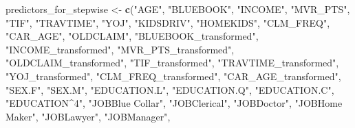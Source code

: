 \documentclass[
]{article}
\newenvironment{Shaded}{\begin{snugshade}}{\end{snugshade}}
\newcommand{\FunctionTok}[1]{\textcolor[rgb]{0.13,0.29,0.53}{\textbf{#1}}}
\newcommand{\NormalTok}[1]{#1}
\newcommand{\OtherTok}[1]{\textcolor[rgb]{0.56,0.35,0.01}{#1}}
\newcommand{\StringTok}[1]{\textcolor[rgb]{0.31,0.60,0.02}{#1}}
\begin{document}
\begin{Shaded}
\begin{Highlighting}[]
\NormalTok{  predictors\_for\_stepwise }\OtherTok{\textless{}{-}} \FunctionTok{c}\NormalTok{(}\StringTok{"\textasciigrave{}AGE\textasciigrave{}"}\NormalTok{, }\StringTok{"\textasciigrave{}BLUEBOOK\textasciigrave{}"}\NormalTok{, }\StringTok{"\textasciigrave{}INCOME\textasciigrave{}"}\NormalTok{, }
                  \StringTok{"\textasciigrave{}MVR\_PTS\textasciigrave{}"}\NormalTok{, }\StringTok{"\textasciigrave{}TIF\textasciigrave{}"}\NormalTok{, }\StringTok{"\textasciigrave{}TRAVTIME\textasciigrave{}"}\NormalTok{, }
                  \StringTok{"\textasciigrave{}YOJ\textasciigrave{}"}\NormalTok{, }\StringTok{"\textasciigrave{}KIDSDRIV\textasciigrave{}"}\NormalTok{, }\StringTok{"\textasciigrave{}HOMEKIDS\textasciigrave{}"}\NormalTok{, }
                  \StringTok{"\textasciigrave{}CLM\_FREQ\textasciigrave{}"}\NormalTok{, }\StringTok{"\textasciigrave{}CAR\_AGE\textasciigrave{}"}\NormalTok{, }\StringTok{"\textasciigrave{}OLDCLAIM\textasciigrave{}"}\NormalTok{, }
                  \StringTok{"\textasciigrave{}BLUEBOOK\_transformed\textasciigrave{}"}\NormalTok{, }\StringTok{"\textasciigrave{}INCOME\_transformed\textasciigrave{}"}\NormalTok{, }\StringTok{"\textasciigrave{}MVR\_PTS\_transformed\textasciigrave{}"}\NormalTok{, }
                  \StringTok{"\textasciigrave{}OLDCLAIM\_transformed\textasciigrave{}"}\NormalTok{, }\StringTok{"\textasciigrave{}TIF\_transformed\textasciigrave{}"}\NormalTok{, }\StringTok{"\textasciigrave{}TRAVTIME\_transformed\textasciigrave{}"}\NormalTok{, }
                  \StringTok{"\textasciigrave{}YOJ\_transformed\textasciigrave{}"}\NormalTok{, }\StringTok{"\textasciigrave{}CLM\_FREQ\_transformed\textasciigrave{}"}\NormalTok{, }\StringTok{"\textasciigrave{}CAR\_AGE\_transformed\textasciigrave{}"}\NormalTok{, }
                  \StringTok{"\textasciigrave{}SEX.F\textasciigrave{}"}\NormalTok{, }\StringTok{"\textasciigrave{}SEX.M\textasciigrave{}"}\NormalTok{, }\StringTok{"\textasciigrave{}EDUCATION.L\textasciigrave{}"}\NormalTok{, }
                  \StringTok{"\textasciigrave{}EDUCATION.Q\textasciigrave{}"}\NormalTok{, }\StringTok{"\textasciigrave{}EDUCATION.C\textasciigrave{}"}\NormalTok{, }\StringTok{"\textasciigrave{}EDUCATION\^{}4\textasciigrave{}"}\NormalTok{, }
                  \StringTok{"\textasciigrave{}JOBBlue Collar\textasciigrave{}"}\NormalTok{, }\StringTok{"\textasciigrave{}JOBClerical\textasciigrave{}"}\NormalTok{, }\StringTok{"\textasciigrave{}JOBDoctor\textasciigrave{}"}\NormalTok{, }
                  \StringTok{"\textasciigrave{}JOBHome Maker\textasciigrave{}"}\NormalTok{, }\StringTok{"\textasciigrave{}JOBLawyer\textasciigrave{}"}\NormalTok{, }\StringTok{"\textasciigrave{}JOBManager\textasciigrave{}"}\NormalTok{, }

\end{Highlighting}
\end{Shaded}
\end{document}
